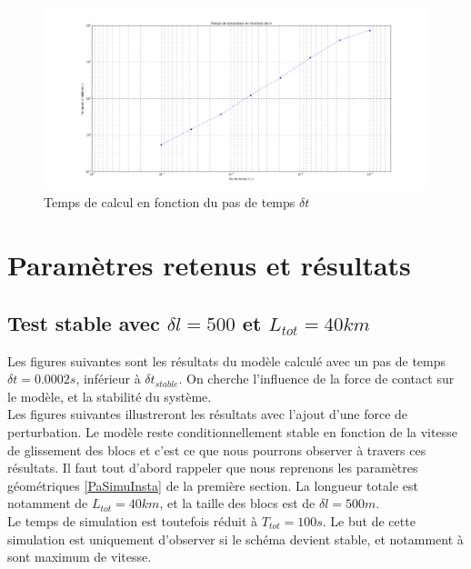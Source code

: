 \documentclass[11pt, a4paper]{article}
\begin{document}
\begin{figure}[h!]
    \centering
    \includegraphics[width=1\linewidth]{figures/Part2/TempsCalcul.png}
    \caption{Temps de calcul en fonction du pas de temps $\delta t$}
    \label{TpsComputeDtLoop}
\end{figure}
\section{Paramètres retenus et résultats}

\subsection{Test stable avec $\delta l =500$ et $L_{tot} = 40km$}
Les figures suivantes sont les résultats du modèle calculé avec un pas de temps $\delta t =0.0002s$, inférieur à $\delta t_{stable}$. On cherche l'influence de la force de contact sur le modèle, et la stabilité du système.
\\

Les figures suivantes illustreront les résultats avec l'ajout d'une force de perturbation. Le modèle reste conditionnellement stable en fonction de la vitesse de glissement des blocs et c'est ce que nous pourrons observer à travers ces résultats. Il faut tout d'abord rappeler que nous reprenons les paramètres géométriques \ref{PaSimuInsta} de la première section. La longueur totale est notamment de $L_{tot} = 40km$, et la taille des blocs est de $\delta l = 500m$. 
\\ Le temps de simulation est toutefois réduit à $T_{tot} = 100s$. Le but de cette simulation est uniquement d'observer si le schéma devient stable, et notamment à sont maximum de vitesse.
\\
\end{document}
